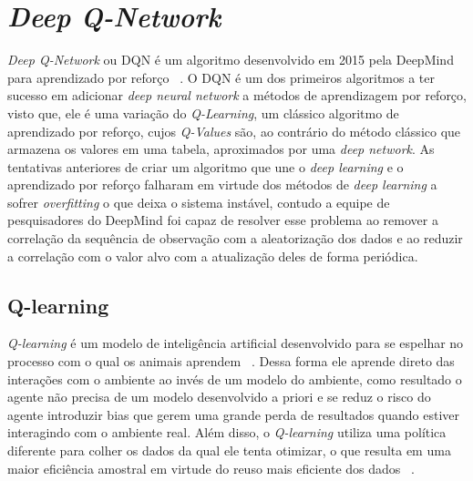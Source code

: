 

\chapter{\emph{Deep Q-Network}}
\label{cap:dqn}


\enlargethispage{.5\baselineskip}
\emph{Deep Q-Network} ou DQN é um algoritmo desenvolvido em 2015 pela DeepMind para aprendizado por reforço ~\citep{Human-level-control}. O DQN é um dos primeiros algoritmos a ter sucesso em adicionar \emph{deep neural network} a métodos de aprendizagem por reforço, visto que, ele é uma variação do \emph{Q-Learning}, um clássico algoritmo de aprendizado por reforço, cujos \emph{Q-Values} são, ao contrário do método clássico que armazena os valores em uma tabela, aproximados por uma \emph{deep network}. As tentativas anteriores de criar um algoritmo que une o \emph{deep learning} e o aprendizado por reforço falharam em virtude dos métodos de \emph{deep learning} a sofrer \emph{overfitting} o que deixa o sistema instável, contudo a equipe de pesquisadores do DeepMind foi capaz de resolver esse problema ao remover a correlação da sequência de observação com a aleatorização dos dados e ao reduzir a correlação com o valor alvo com a atualização deles de forma periódica.

\section{Q-learning}
\label{sec:q-learning}

\enlargethispage{.5\baselineskip}

\emph{Q-learning} é um modelo de inteligência artificial desenvolvido para se espelhar no processo com o qual os animais aprendem ~\citep{Watkins:PhD}. Dessa forma ele aprende direto das interações com o ambiente ao invés de um modelo do ambiente, como resultado o agente não precisa de um modelo desenvolvido a priori e se reduz o risco do agente introduzir bias que gerem uma grande perda de resultados quando estiver interagindo com o ambiente real. Além disso, o \emph{Q-learning} utiliza uma política diferente para colher os dados da qual ele tenta otimizar, o que resulta em uma maior eficiência amostral em virtude do reuso mais eficiente dos dados ~\citep{Nguyen_La_2019}.



